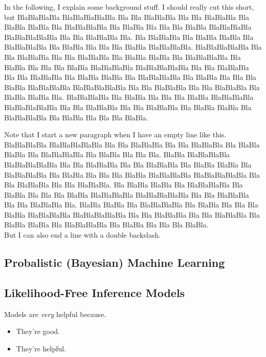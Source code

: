 \documentclass[11pt,twoside]{article}
\numberwithin{Theorem}{section}
\numberwithin{Definition}{section}
\numberwithin{Lemma}{section}
\numberwithin{Algorithm}{section}
\numberwithin{equation}{section}
\begin{document}
In the following, I explain some background stuff. I should really cut this short, but BlaBlaBlaBla BlaBlaBlaBlaBla Bla Bla BlaBlaBla Bla Bla BlaBlaBla Bla BlaBla BlaBla Bla BlaBlaBlaBla Bla BlaBla Bla Bla Bla BlaBla BlaBlaBlaBla BlaBlaBlaBlaBla Bla Bla BlaBlaBla Bla. Bla BlaBlaBla Bla BlaBla BlaBla Bla BlaBlaBlaBla Bla BlaBla Bla Bla Bla BlaBla BlaBlaBlaBla. BlaBlaBlaBlaBla Bla Bla BlaBlaBla Bla Bla BlaBlaBla Bla BlaBla BlaBla Bla BlaBlaBlaBla Bla BlaBla Bla Bla Bla BlaBla BlaBlaBlaBla BlaBlaBlaBlaBla Bla Bla BlaBlaBla Bla Bla BlaBlaBla Bla BlaBla BlaBla Bla BlaBlaBlaBla Bla BlaBla Bla Bla Bla BlaBla BlaBlaBlaBla BlaBlaBlaBlaBla Bla Bla BlaBlaBla Bla Bla BlaBlaBla Bla BlaBla BlaBla Bla. BlaBlaBlaBla Bla BlaBla Bla Bla Bla BlaBla BlaBlaBlaBla BlaBlaBlaBlaBla Bla Bla BlaBlaBla Bla Bla BlaBlaBla Bla BlaBla BlaBla Bla BlaBlaBlaBla Bla BlaBla Bla Bla Bla BlaBla.

Note that I start a new paragraph when I have an empty line like this. BlaBlaBlaBla BlaBlaBlaBlaBla Bla Bla BlaBlaBla Bla Bla BlaBlaBla Bla BlaBla BlaBla Bla BlaBlaBlaBla Bla BlaBla Bla Bla Bla. BlaBla BlaBlaBlaBla BlaBlaBlaBlaBla Bla Bla BlaBlaBla Bla Bla BlaBlaBla Bla BlaBla BlaBla Bla BlaBlaBlaBla Bla BlaBla Bla Bla Bla BlaBla BlaBlaBlaBla BlaBlaBlaBlaBla Bla Bla BlaBlaBla Bla Bla BlaBlaBla. Bla BlaBla BlaBla Bla BlaBlaBlaBla Bla BlaBla Bla Bla Bla BlaBla BlaBlaBlaBla BlaBlaBlaBlaBla Bla Bla BlaBlaBla Bla Bla BlaBlaBla Bla. BlaBla BlaBla Bla BlaBlaBlaBla Bla BlaBla Bla Bla Bla BlaBla BlaBlaBlaBla BlaBlaBlaBlaBla Bla Bla BlaBlaBla Bla Bla BlaBlaBla Bla BlaBla BlaBla Bla BlaBlaBlaBla Bla BlaBla Bla Bla Bla BlaBla.\\
But I can also end a line with a double backslash.
\clearpage

\subsection{Probalistic (Bayesian) Machine Learning}

\subsection{Likelihood-Free Inference Models}
\label{sec:Models}

Models are \emph{very} helpful because.
\begin{itemize}
 \item They're good.
 \item They're helpful.
\end{itemize}
\clearpage
\end{document}
